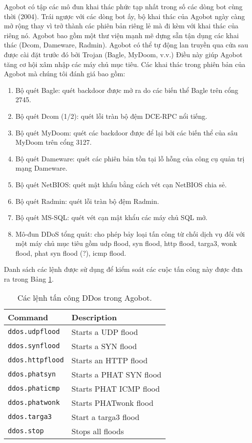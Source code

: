 Agobot có tập các mô đun khai thác phức tạp nhất trong số các dòng bot cùng thời (2004).
Trái ngược với các dòng bot ấy, bộ khai thác của Agobot ngày càng mở rộng thay vì trở thành các phiên bản riêng lẻ mà đi kèm với khai thác của riêng nó.
Agobot bao gồm một thư viện mạnh mẽ dựng sẵn tận dụng các khai thác (Dcom, Dameware, Radmin).
Agobot có thể tự động lan truyền qua cửa sau được cài đặt trước đó bởi Trojan (Bagle, MyDoom, v.v.)
Điều này giúp Agobot tăng cơ hội xâm nhập các máy chủ mục tiêu.
Các khai thác trong phiên bản của Agobot mà chúng tôi đánh giá bao gồm:

\begin{enumerate}
\item Bộ quét Bagle: quét backdoor được mở ra do các biến thể Bagle trên cổng 2745.
\item Bộ quét Dcom (1/2): quét lỗi tràn bộ đệm DCE-RPC nổi tiếng.
\item Bộ quét MyDoom: quét các backdoor được để lại bởi các biến thể của sâu MyDoom trên cổng 3127.
\item Bộ quét Dameware: quét các phiên bản tồn tại lỗ hỗng của công cụ quản trị mạng Dameware.
\item Bộ quét NetBIOS: quét mật khẩu bằng cách vét cạn NetBIOS chia sẻ.
\item Bộ quét Radmin: quét lỗi tràn bộ đệm Radmin.
\item Bộ quét MS-SQL: quét vét cạn mật khẩu các máy chủ SQL mở.
\item Mô-đun DDoS tổng quát: cho phép bảy loại tấn công từ chối dịch vụ đối với một máy chủ mục
	tiêu gồm udp flood, syn flood, http flood, targa3, wonk flood, phat syn flood (?), icmp flood.
\end{enumerate}

Danh sách các lệnh được sử dụng để kiểm soát các cuộc tấn công này được đưa ra trong Bảng \ref{table:botattack}.

\begin{table}[ht!]
	\caption{Các lệnh tấn công DDos trong Agobot.}
	\label{table:botattack}
	\centering
	\footnotesize
	\begin{tabular}{l l}
		\toprule
		\textbf{Command} &
		\textbf{Description} \\
		\midrule
\texttt{ddos.udpflood} & Starts a UDP flood\\
\texttt{ddos.synflood} & Starts a SYN flood\\
\texttt{ddos.httpflood} & Starts an HTTP flood\\
\texttt{ddos.phatsyn} & Starts a PHAT SYN flood\\
\texttt{ddos.phaticmp} & Starts PHAT ICMP flood\\
\texttt{ddos.phatwonk} & Starts PHATwonk flood\\
\texttt{ddos.targa3} & Start a targa3 flood\\
\texttt{ddos.stop} & Stops all floods\\
		\bottomrule
	\end{tabular}
\end{table}

